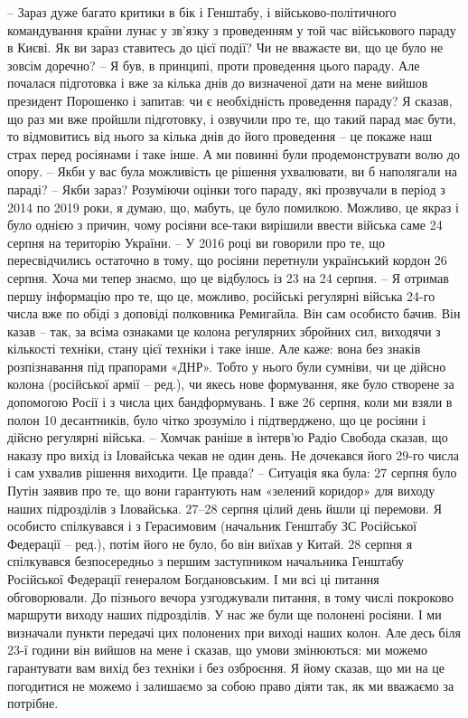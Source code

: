 – Зараз дуже багато критики в бік і Генштабу, і військово-політичного командування країни лунає у зв’язку з проведенням у той час військового параду в Києві. Як ви зараз ставитесь до цієї події? Чи не вважаєте ви, що це було не зовсім доречно?
– Я був, в принципі, проти проведення цього параду. Але почалася підготовка і вже за кілька днів до визначеної дати на мене вийшов президент Порошенко і запитав: чи є необхідність проведення параду? Я сказав, що раз ми вже пройшли підготовку, і озвучили про те, що такий парад має бути, то відмовитись від нього за кілька днів до його проведення – це покаже наш страх перед росіянами і таке інше. А ми повинні були продемонструвати волю до опору.
– Якби у вас була можливість це рішення ухвалювати, ви б наполягали на параді?
– Якби зараз? Розуміючи оцінки того параду, які прозвучали в період з 2014 по 2019 роки, я думаю, що, мабуть, це було помилкою. Можливо, це якраз і було однією з причин, чому росіяни все-таки вирішили ввести війська саме 24 серпня на територію України.
– У 2016 році ви говорили про те, що пересвідчились остаточно в тому, що росіяни перетнули український кордон 26 серпня. Хоча ми тепер знаємо, що це відбулось із 23 на 24 серпня.
– Я отримав першу інформацію про те, що це, можливо, російські регулярні війська 24-го числа вже по обіді з доповіді полковника Ремигайла. Він сам особисто бачив. Він казав – так, за всіма ознаками це колона регулярних збройних сил, виходячи з кількості техніки, стану цієї техніки і таке інше. Але каже: вона без знаків розпізнавання під прапорами «ДНР». Тобто у нього були сумніви, чи це дійсно колона (російської армії – ред.), чи якесь нове формування, яке було створене за допомогою Росії і з числа цих бандформувань. І вже 26 серпня, коли ми взяли в полон 10 десантників, було чітко зрозуміло і підтверджено, що це росіяни і дійсно регулярні війська.
– Хомчак раніше в інтерв’ю Радіо Свобода сказав, що наказу про вихід із Іловайська чекав не один день. Не дочекався його 29-го числа і сам ухвалив рішення виходити. Це правда?
– Ситуація яка була: 27 серпня було Путін заявив про те, що вони гарантують нам «зелений коридор» для виходу наших підрозділів з Іловайська. 27–28 серпня цілий день йшли ці перемови. Я особисто спілкувався і з Герасимовим (начальник Генштабу ЗС Російської Федерації – ред.), потім його не було, бо він виїхав у Китай. 28 серпня я спілкувався безпосередньо з першим заступником начальника Генштабу Російської Федерації генералом Богдановським. І ми всі ці питання обговорювали. До пізнього вечора узгоджували питання, в тому числі покроково маршрути виходу наших підрозділів. У нас же були ще полонені росіяни. І ми визначали пункти передачі цих полонених при виході наших колон. Але десь біля 23-ї години він вийшов на мене і сказав, що умови змінюються: ми можемо гарантувати вам вихід без техніки і без озброєння. Я йому сказав, що ми на це погодитися не можемо і залишаємо за собою право діяти так, як ми вважаємо за потрібне.
